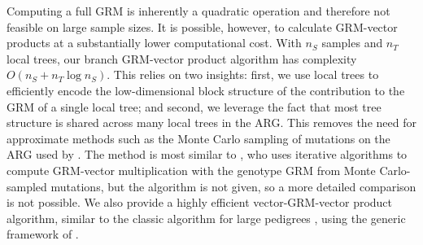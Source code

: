 
%
Computing a full GRM is inherently a quadratic operation and therefore not feasible on large sample sizes. It is possible, however, to calculate GRM-vector products at a substantially lower computational cost.
With $n_S$ samples and $n_T$ local trees, our branch GRM-vector product algorithm has complexity $O(n_S + n_T \log n_S)$. This relies on two insights: first, we use local trees to
efficiently encode the low-dimensional block structure
of the contribution to the GRM of a single local tree;
and second, we leverage the fact that most tree structure
is shared across many local trees in the ARG.
This removes the need for approximate methods
such as the Monte Carlo sampling of mutations on the ARG
used by \citet{zhang2023biobank}.
The method is most similar to \citet{zhu2024variance},
who uses iterative algorithms
to compute GRM-vector multiplication with the
genotype GRM from Monte Carlo-sampled mutations,
but the algorithm is not given, so a more detailed comparison
is not possible.
We also provide a highly efficient vector-GRM-vector product algorithm,
similar to the classic algorithm for large pedigrees \citep{colleau2002indirect},
using the generic framework of \citet{ralph2020efficiently}.

